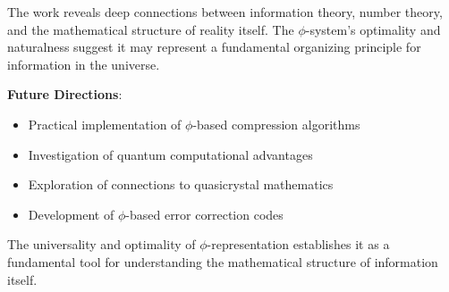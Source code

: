 \documentclass[12pt,letterpaper]{article}
\begin{document}
The work reveals deep connections between information theory, number theory, and the mathematical structure of reality itself. The $\phi$-system's optimality and naturalness suggest it may represent a fundamental organizing principle for information in the universe.

\textbf{Future Directions}:
\begin{itemize}
\item Practical implementation of $\phi$-based compression algorithms
\item Investigation of quantum computational advantages
\item Exploration of connections to quasicrystal mathematics
\item Development of $\phi$-based error correction codes
\end{itemize}

The universality and optimality of $\phi$-representation establishes it as a fundamental tool for understanding the mathematical structure of information itself.



\end{document}
